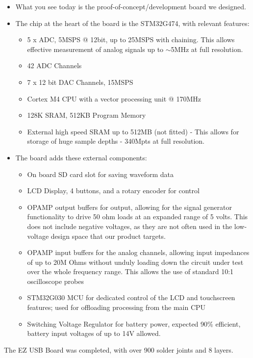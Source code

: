 \begin{itemize}
	\item What you see today is the proof-of-concept/development board we designed.
	\item The chip at the heart of the board is the STM32G474, with relevant features:
	\begin{itemize}
		\item 5 x ADC, 5MSPS @ 12bit, up to 25MSPS with chaining. This allows effective measurement of analog signals up to $\sim$5MHz at full resolution.
		\item 42 ADC Channels
		\item 7 x 12 bit DAC Channels, 15MSPS
		\item Cortex M4 CPU with a vector processing unit @ 170MHz
		\item 128K SRAM, 512KB Program Memory
		\item External high speed SRAM up to 512MB (not fitted) - This allows for storage of huge sample depths - 340Mpts at full resolution.
	\end{itemize}
	\item The board adds these external components:
	\begin{itemize}
		\item On board SD card slot for saving waveform data
		\item LCD Display, 4 buttons, and a rotary encoder for control
		\item OPAMP output buffers for output, allowing for the signal generator functionality to drive 50 ohm loads at an expanded range of 5 volts. This does not include negative voltages, as they are not often used in the low-voltage design space that our product targets.
		\item OPAMP input buffers for the analog channels, allowing input impedances of up to 20M Ohms without unduly loading down the circuit under test over the whole frequency range. This allows the use of standard 10:1 oscilloscope probes
		\item STM32G030 MCU for dedicated control of the LCD and touchscreen features; used for offloading processing from the main CPU
		\item Switching Voltage Regulator for battery power, expected 90\% efficient, battery input voltages of up to 14V allowed.
	\end{itemize}
\end{itemize}

The EZ USB Board was completed, with over 900 solder joints and 8 layers.

